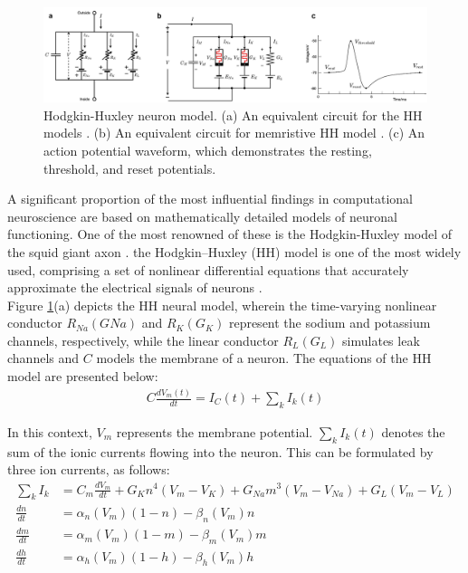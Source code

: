 \begin{figure}[htbp!] 
    \centering    
    \includegraphics[width=1\textwidth]{Chapter1/Figs/1c.png}
    \caption[Hodgkin-Huxley neuron model.]{Hodgkin-Huxley neuron model. (a) An equivalent circuit for the HH models \cite{hodgkin1952quantitative}. (b) An equivalent circuit for memristive HH model \cite{chua2012hodgkin}. (c) An action potential waveform, which demonstrates the resting, threshold, and reset potentials. }
    \label{fig:1c}
\end{figure}

\noindent A significant proportion of the most influential findings in computational neuroscience are based on mathematically detailed models of neuronal functioning. One of the most renowned of these is the Hodgkin-Huxley model of the squid giant axon \cite{hodgkin1952quantitative}. the Hodgkin–Huxley (HH) model is one of the most widely used, comprising a set of nonlinear differential equations that accurately approximate the electrical signals of neurons \cite{chua2012hodgkin}. \\

\noindent Figure \ref{fig:1c}(a) depicts the HH neural model, wherein the time-varying nonlinear conductor $R_{Na}(GNa)$ and $R_K(G_K)$ represent the sodium and potassium channels, respectively, while the linear conductor $R_L(G_L)$ simulates leak channels and $C$ models the membrane of a neuron. The equations of the HH model are presented below: 
\begin{align}
    C \frac{dV_m(t)}{dt} = I_C(t) + \sum_{k}^{}I_k(t) \label{eq:1.1} 
\end{align}

\noindent In this context, $V_m$ represents the membrane potential. $\sum_{k}^{}I_k(t)$ denotes the sum of the ionic currents flowing into the neuron. This can be formulated by three ion currents, as follows:
\begin{align}
    \sum_{k}^{}I_k &= C_m \frac{dV_m}{dt} + G_Kn^4(V_m - V_K) + G_{Na}m^3(V_m - V_{Na}) + G_L (V_m - V_L) \label{eq:1.2} \\
    \frac{dn}{dt} &= \alpha_n(V_m)(1-n)-\beta_n(V_m)n \label{eq:1.3} \\
    \frac{dm}{dt} &= \alpha_m(V_m)(1-m) - \beta_m(V_m)m \label{eq:1.4} \\
    \frac{dh}{dt} &= \alpha_h(V_m)(1-h)-\beta_h(V_m)h \label{eq:1.5}
\end{align}

